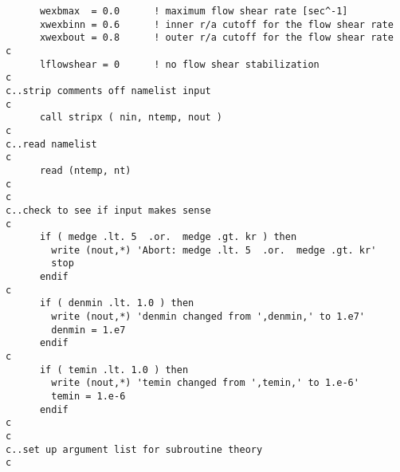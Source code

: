 \begin{verbatim}
      wexbmax  = 0.0      ! maximum flow shear rate [sec^-1]
      xwexbinn = 0.6      ! inner r/a cutoff for the flow shear rate
      xwexbout = 0.8      ! outer r/a cutoff for the flow shear rate
c
      lflowshear = 0      ! no flow shear stabilization
c
c..strip comments off namelist input
c
      call stripx ( nin, ntemp, nout )
c
c..read namelist
c
      read (ntemp, nt)
c
c
c..check to see if input makes sense
c
      if ( medge .lt. 5  .or.  medge .gt. kr ) then
        write (nout,*) 'Abort: medge .lt. 5  .or.  medge .gt. kr'
        stop
      endif
c
      if ( denmin .lt. 1.0 ) then
        write (nout,*) 'denmin changed from ',denmin,' to 1.e7'
        denmin = 1.e7
      endif
c
      if ( temin .lt. 1.0 ) then
        write (nout,*) 'temin changed from ',temin,' to 1.e-6'
        temin = 1.e-6
      endif
c
c
c..set up argument list for subroutine theory
c


\end{verbatim}
